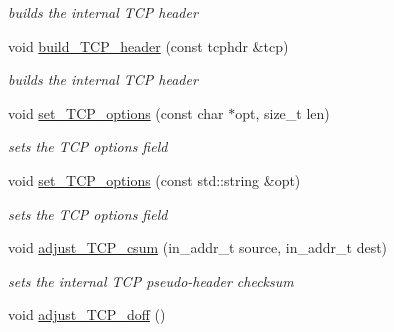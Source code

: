 \begin{CompactItemize}
\begin{CompactList}\small\item\em builds the internal TCP header \item\end{CompactList}\item 
void \hyperlink{classsocketpp_1_1TCP__RawSocket_8c35edfc4d8c2fbccf0fe13485dd2ef1}{build\_\-TCP\_\-header} (const tcphdr \&tcp)
\begin{CompactList}\small\item\em builds the internal TCP header \item\end{CompactList}\item 
void \hyperlink{classsocketpp_1_1TCP__RawSocket_c38e057fc6ece02026e71b7ee872533f}{set\_\-TCP\_\-options} (const char $\ast$opt, size\_\-t len)
\begin{CompactList}\small\item\em sets the TCP options field \item\end{CompactList}\item 
void \hyperlink{classsocketpp_1_1TCP__RawSocket_7bc9043e86c6f328cb99d98c4bfca05a}{set\_\-TCP\_\-options} (const std::string \&opt)
\begin{CompactList}\small\item\em sets the TCP options field \item\end{CompactList}\item 
void \hyperlink{classsocketpp_1_1TCP__RawSocket_c1a2ef8b2661bb0f3ca3fa6a636b25fd}{adjust\_\-TCP\_\-csum} (in\_\-addr\_\-t source, in\_\-addr\_\-t dest)
\begin{CompactList}\small\item\em sets the internal TCP pseudo-header checksum \item\end{CompactList}\item 
\hypertarget{classsocketpp_1_1TCP__RawSocket_029eb8bfbf19531253edf046775d9f5f}{
void \hyperlink{classsocketpp_1_1TCP__RawSocket_029eb8bfbf19531253edf046775d9f5f}{adjust\_\-TCP\_\-doff} ()}
\label{classsocketpp_1_1TCP__RawSocket_029eb8bfbf19531253edf046775d9f5f}


\end{CompactItemize}
